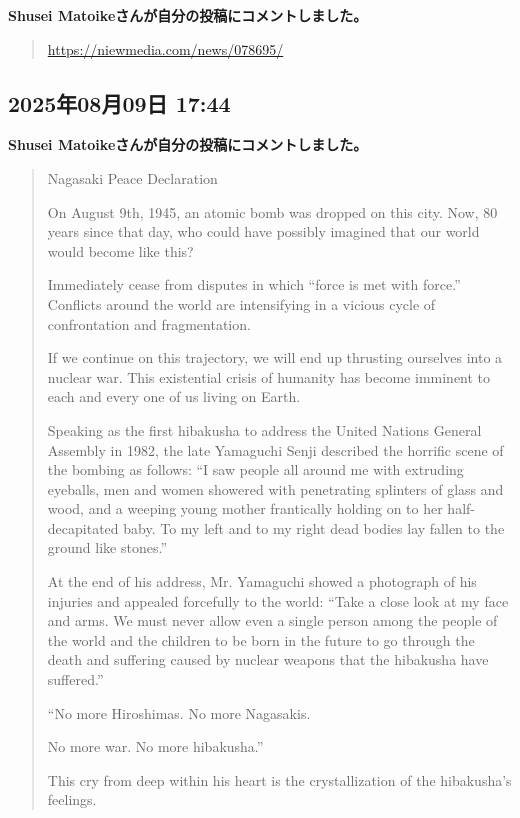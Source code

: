 \textbf{Shusei Matoikeさんが自分の投稿にコメントしました。}

\begin{quote}
\url{https://niewmedia.com/news/078695/}
\end{quote}

\subsection*{2025年08月09日 17:44}

\textbf{Shusei Matoikeさんが自分の投稿にコメントしました。}

\begin{quote}
Nagasaki Peace Declaration

On August 9th, 1945, an atomic bomb was dropped on this city. Now, 80 years since that day, who could have possibly imagined that our world would become like this?

Immediately cease from disputes in which “force is met with force.” Conflicts around the world are intensifying in a vicious cycle of confrontation and fragmentation.

If we continue on this trajectory, we will end up thrusting ourselves into a nuclear war. This existential crisis of humanity has become imminent to each and every one of us living on Earth.

Speaking as the first hibakusha to address the United Nations General Assembly in 1982, the late Yamaguchi Senji described the horrific scene of the bombing as follows: “I saw people all around me with extruding eyeballs, men and women showered with penetrating splinters of glass and wood, and a weeping young mother frantically holding on to her half-decapitated baby. To my left and to my right dead bodies lay fallen to the ground like stones.”

At the end of his address, Mr. Yamaguchi showed a photograph of his injuries and appealed forcefully to the world: “Take a close look at my face and arms. We must never allow even a single person among the people of the world and the children to be born in the future to go through the death and suffering caused by nuclear weapons that the hibakusha have suffered.”

“No more Hiroshimas. No more Nagasakis.

No more war. No more hibakusha.”

This cry from deep within his heart is the crystallization of the hibakusha’s feelings.


\end{quote}
